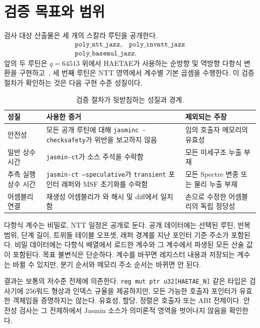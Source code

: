 \documentclass[10pt,twocolumn]{article}
\newcommand{\haetae}{HAETAE}
\newcommand{\jasmin}{Jasmin}
\newcommand{\ct}{상수 시간}
\newcommand{\sct}{추측 실행 상수 시간}
\begin{document}
\section{검증 목표와 범위}

검사 대상 산출물은 세 개의 스칼라 루틴을 공개한다.
\[
\begin{array}{c}
  \texttt{poly\_ntt\_jazz},\quad \texttt{poly\_invntt\_jazz}\\
  \texttt{poly\_basemul\_jazz}.
\end{array}
\]
앞의 두 루틴은 \(q=64513\) 위에서 \haetae{}가 사용하는 순방향 및
역방향 다항식 변환을 구현하고~\cite{HAETAE2022}, 세 번째 루틴은 NTT
영역에서 계수별 기본 곱셈을 수행한다. 이 검증 절차가 확인하는 것은
다음 구현 수준 성질이다.

\begin{table}[t]
\centering
\scriptsize
\setlength{\tabcolsep}{3pt}
\begin{tabular}{P{0.25\columnwidth}P{0.39\columnwidth}P{0.26\columnwidth}}
\toprule
성질 & 사용한 증거 & 제외되는 주장 \tabularnewline
\midrule
안전성 & 모든 공개 루틴에 대해 \texttt{jasminc -checksafety}가 위반을
보고하지 않음 & 임의 호출자 메모리의 유효성 \tabularnewline
일반 \ct{} & \texttt{jasmin-ct}가 소스 주석을 수락함 & 모든
미세구조 누출 부재 \tabularnewline
\sct{} & \texttt{jasmin-ct --speculative}가 \texttt{transient} 포인터 래퍼와 MSF
초기화를 수락함 & 모든 Spectre 변종 또는 물리 누출 부재 \tabularnewline
어셈블리 연결 & 재생성 어셈블리가 와 해시 및 diff에서
일치함 & 손으로 수정한 어셈블리의 독립 정당성 \tabularnewline
\bottomrule
\end{tabular}
\caption{검증 절차가 뒷받침하는 성질과 경계.}
\label{tab:ko-claims}
\end{table}

다항식 계수는 비밀로, NTT 일정은 공개로 둔다. 공개 데이터에는 선택된
루틴, 반복 범위, 단계 길이, 트위들 테이블 오프셋, 래퍼 경계를 지난
포인터 기준 주소가 포함된다. 비밀 데이터에는 다항식 배열에서 로드한
계수와 그 계수에서 파생된 모든 산술 값이 포함된다. 목표 불변식은 단순하다.
계수를 바꾸면 레지스터 내용과 저장되는 계수는 바뀔 수 있지만, 분기
순서와 메모리 주소 순서는 바뀌면 안 된다.

결과는 보통의 저수준 전제에 의존한다. \texttt{reg mut ptr
u32[HAETAE\_N]} 같은 타입은 검사기에 256워드 형상과 인덱스 규율을
제공하지만, 모든 가능한 호출자 포인터가 유효한 객체임을 증명하지는
않는다. 유효성, 할당, 정렬은 호출자 또는 ABI 전제이다. 안전성 검사는
그 전제하에서 \jasmin{} 소스가 의미론적 영역을 벗어나지 않음을 확인한다.
\end{document}

